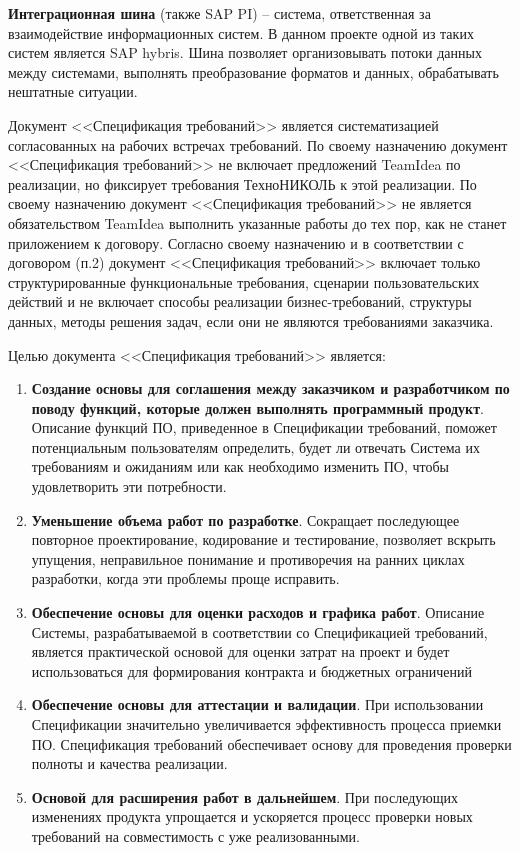 \textbf{Интеграционная шина} (также SAP PI) -- система, ответственная за взаимодействие информационных систем. В данном проекте одной из таких систем является SAP hybris. Шина позволяет организовывать потоки данных между системами, выполнять преобразование форматов и данных, обрабатывать нештатные ситуации. 



Документ <<Спецификация требований>> является систематизацией согласованных на рабочих встречах требований. По своему назначению документ <<Спецификация требований>>  не включает предложений TeamIdea по реализации, но фиксирует требования ТехноНИКОЛЬ к этой реализации. По своему назначению документ <<Спецификация требований>> не является обязательством TeamIdea выполнить указанные работы до тех пор, как не станет приложением к договору. Согласно своему назначению и в соответствии с договором (п.2) документ <<Спецификация требований>> включает только структурированные функциональные требования, сценарии пользовательских действий и не включает способы реализации бизнес-требований, структуры данных, методы решения задач, если они не являются требованиями заказчика. 


Целью документа <<Спецификация требований>> является:

\begin{enumerate}
\item \textbf{Создание основы для соглашения между заказчиком и разработчиком по поводу функций, которые должен выполнять программный продукт}. Описание функций ПО, приведенное в Спецификации требований, поможет потенциальным пользователям определить, будет ли отвечать Система их требованиям и ожиданиям или как необходимо изменить ПО, чтобы удовлетворить эти потребности. 
\item \textbf{Уменьшение объема работ по разработке}. Сокращает последующее повторное проектирование, кодирование и тестирование, позволяет вскрыть упущения, неправильное понимание и противоречия на ранних циклах разработки, когда эти проблемы проще исправить.
\item \textbf{Обеспечение основы для оценки расходов и графика работ}. Описание Системы, разрабатываемой в соответствии со Спецификацией требований, является практической основой для оценки затрат на проект и будет использоваться для формирования контракта и бюджетных ограничений
\item \textbf{Обеспечение основы для аттестации и валидации}. При использовании Спецификации значительно увеличивается эффективность процесса приемки ПО. Спецификация требований обеспечивает основу для проведения проверки полноты и качества реализации.
\item \textbf{Основой для расширения работ в дальнейшем}. При последующих изменениях продукта упрощается и ускоряется процесс проверки новых требований на совместимость с уже реализованными.  
\end{enumerate}

